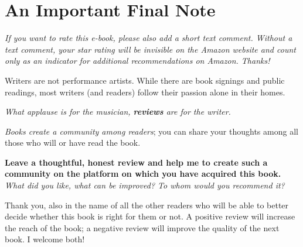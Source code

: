 

\chapter{An Important Final Note}

\ifxetex \else \textit{If you want to rate this e-book, please also add a short text comment. Without a text comment, your star rating will be invisible on the Amazon website and count only as an indicator for additional recommendations on Amazon. Thanks!}\fi

Writers are not performance artists. While there are book signings and public readings, most writers (and readers) follow their passion alone in their homes.

\textit{What applause is for the musician, \textbf{reviews} are for the writer.} 

\textit{Books create a community among readers}; you can share your thoughts among all those who will or have read the book.

\textbf{Leave a thoughtful, honest review and help me to create such a community on the platform on which you have acquired this book.} 
\textit{What did you like, what can be improved? To whom would you recommend it?} 

Thank you, also in the name of all the other readers who will be able to better decide whether this book is right for them or not. A positive review will increase the reach of the book; a negative review will improve the quality of the next book. I welcome both!